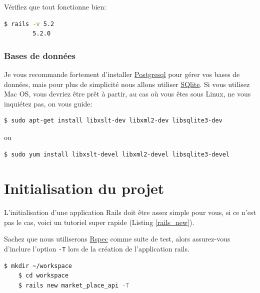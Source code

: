\documentclass[]{report}
\begin{document}
        Vérifiez que tout fonctionne bien:

        \begin{scriptsize}
        \begin{lstlisting}[language=bash]
        $ rails -v 5.2
        5.2.0
        \end{lstlisting}
        \end{scriptsize}

      \subsubsection{Bases de données}

        Je vous recommande fortement d'installer \href{http://www.postgresql.org/}{Postgresql} pour gérer vos bases de données, mais pour plus de simplicité nous allons utiliser \href{http://www.sqlite.org/}{SQlite}. Si vous utilisez Mac OS, vous devriez être prêt à partir, au cas où vous êtes sous Linux, ne vous inquiétez pas, on vous guide:

        \begin{scriptsize}
        \begin{lstlisting}[language=bash]
        $ sudo apt-get install libxslt-dev libxml2-dev libsqlite3-dev
        \end{lstlisting}
        \end{scriptsize}

        ou

        \begin{scriptsize}
        \begin{lstlisting}[language=bash]
        $ sudo yum install libxslt-devel libxml2-devel libsqlite3-devel
        \end{lstlisting}
        \end{scriptsize}

  \section{Initialisation du projet}

    L'initialisation d'une application Rails doit être assez simple pour vous, si ce n'est pas le cas, voici un tutoriel super rapide (Listing \ref{rails_new}).

    Sachez que nous utiliserons \href{http://rspec.info/}{Rspec} comme suite de test, alors assurez-vous d'inclure l'option \verb|-T| lors de la création de l'application rails.

    \begin{scriptsize}
    \begin{lstlisting}[language=bash, caption={Initialisation du projet avec 'rails new'.}, label={rails_new}]
    $ mkdir ~/workspace
    $ cd workspace
    $ rails new market_place_api -T
    \end{lstlisting}
    \end{scriptsize}
\end{document}
